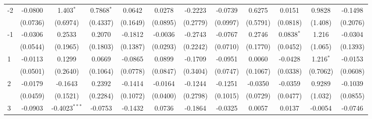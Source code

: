 \begin{adjustbox}{width=650}
\begin{tabular}{lccccccccccc}
    -2    & -0.0800  & 1.403$^{*}$          & 0.7868$^{*}$               & 0.0642        & 0.0278                        & -0.2223                     & -0.0739               & 0.6275           & 0.0151        & 0.9828      & -0.1498\\   
                                            & (0.0736) & (0.6974)             & (0.4337)                   & (0.1649)      & (0.0895)                      & (0.2779)                    & (0.0997)              & (0.5791)         & (0.0818)      & (1.408)     & (0.2076)\\   
    -1    & -0.0306  & 0.2533               & 0.2070                     & -0.1812       & -0.0036                       & -0.2743                     & -0.0767               & 0.2746           & 0.0838$^{*}$  & 1.216       & -0.0304\\   
                                            & (0.0544) & (0.1965)             & (0.1803)                   & (0.1387)      & (0.0293)                      & (0.2242)                    & (0.0710)              & (0.1770)         & (0.0452)      & (1.065)     & (0.1393)\\   
    1     & -0.0113  & 0.1299               & 0.0669                     & -0.0865       & 0.0899                        & -0.1709                     & -0.0951               & 0.0060           & -0.0428       & 1.216$^{*}$ & -0.0153\\   
                                            & (0.0501) & (0.2640)             & (0.1064)                   & (0.0778)      & (0.0847)                      & (0.3404)                    & (0.0747)              & (0.1067)         & (0.0338)      & (0.7062)    & (0.0608)\\   
    2     & -0.0179  & -0.1643              & 0.2392                     & -0.1414       & -0.0164                       & -0.1244                     & -0.1251               & -0.0350          & -0.0359       & 0.9289      & -0.1039\\   
                                            & (0.0459) & (0.1521)             & (0.2284)                   & (0.1072)      & (0.0400)                      & (0.2798)                    & (0.1015)              & (0.0729)         & (0.0477)      & (1.032)     & (0.0855)\\   
    3     & -0.0903  & -0.4023$^{***}$      & -0.0753                    & -0.1432       & 0.0736                        & -0.1864                     & -0.0325               & 0.0057           & 0.0137        & -0.0054     & -0.0746\\   

\end{tabular}
\end{adjustbox}
